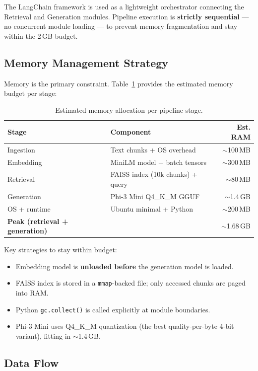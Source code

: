 \documentclass[10pt,twocolumn]{article}
\begin{document}
The LangChain framework is used as a lightweight orchestrator connecting the Retrieval and Generation modules. Pipeline execution is \textbf{strictly sequential} — no concurrent module loading — to prevent memory fragmentation and stay within the 2\,GB budget.

\subsection{Memory Management Strategy}

Memory is the primary constraint. Table~\ref{tab:memory} provides the estimated memory budget per stage:

\begin{table}[H]
\centering
\caption{Estimated memory allocation per pipeline stage.}
\label{tab:memory}
\small
\begin{tabularx}{\linewidth}{@{}lXr@{}}
\toprule
\textbf{Stage} & \textbf{Component} & \textbf{Est. RAM} \\
\midrule
Ingestion & Text chunks + OS overhead & $\sim$100\,MB \\
Embedding & MiniLM model + batch tensors & $\sim$300\,MB \\
Retrieval & FAISS index (10k chunks) + query & $\sim$80\,MB \\
Generation & Phi-3 Mini Q4\_K\_M GGUF & $\sim$1.4\,GB \\
OS + runtime & Ubuntu minimal + Python & $\sim$200\,MB \\
\midrule
\textbf{Peak (retrieval + generation)} & & $\sim$1.68\,GB \\
\bottomrule
\end{tabularx}
\end{table}

Key strategies to stay within budget:
\begin{itemize}[leftmargin=*,itemsep=2pt]
  \item Embedding model is \textbf{unloaded before} the generation model is loaded.
  \item FAISS index is stored in a \texttt{mmap}-backed file; only accessed chunks are paged into RAM.
  \item Python \texttt{gc.collect()} is called explicitly at module boundaries.
  \item Phi-3 Mini uses Q4\_K\_M quantization (the best quality-per-byte 4-bit variant), fitting in $\sim$1.4\,GB.
\end{itemize}

\subsection{Data Flow}
\end{document}
